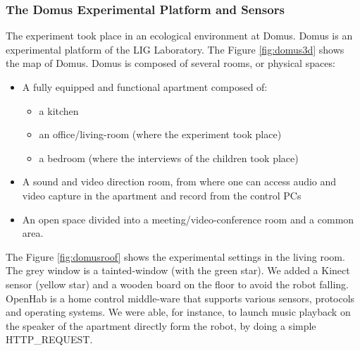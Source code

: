 \documentclass[smallextended]{svjour3}
\begin{document}
\subsubsection{The Domus Experimental Platform and Sensors}
The experiment took place in an ecological environment at Domus.
Domus is an experimental platform of the LIG Laboratory. 
The Figure \ref{fig:domus3d} shows the map of Domus.
Domus is composed of several rooms, or physical spaces:
\begin{itemize}[noitemsep,nolistsep]
	\item A fully equipped and functional apartment composed of:
	\begin{itemize}[noitemsep,nolistsep]
		\item a kitchen
		\item an office/living-room (where the experiment took place)
		\item a bedroom (where the interviews of the children took place)
	\end{itemize}
	\item A sound and video direction room, from where one can access audio and video capture in the apartment and record from the control PCs
	\item An open space divided into a meeting/video-conference room and a common area.
\end{itemize}

The Figure \ref{fig:domusroof} shows the experimental settings in the living room. 
The grey window is a tainted-window (with the green star). 
We added a Kinect sensor (yellow star) and a wooden board on the floor to avoid the robot falling. 
OpenHab is a home control middle-ware that supports various sensors, protocols and operating systems. 
We were able, for instance, to launch music playback on the speaker of the apartment directly form the robot, by doing a simple HTTP\_REQUEST. 
\end{document}
